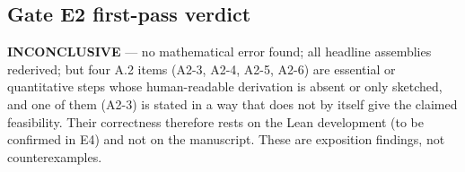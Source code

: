 \documentclass[
]{article}
\begin{document}
\subsection{Gate E2 first-pass
verdict}\label{gate-e2-first-pass-verdict}

\textbf{INCONCLUSIVE} --- no mathematical error found; all headline
assemblies rederived; but four A.2 items (A2-3, A2-4, A2-5, A2-6) are
essential or quantitative steps whose human-readable derivation is
absent or only sketched, and one of them (A2-3) is stated in a way that
does not by itself give the claimed feasibility. Their correctness
therefore rests on the Lean development (to be confirmed in E4) and not
on the manuscript. These are exposition findings, not counterexamples.
\end{document}
